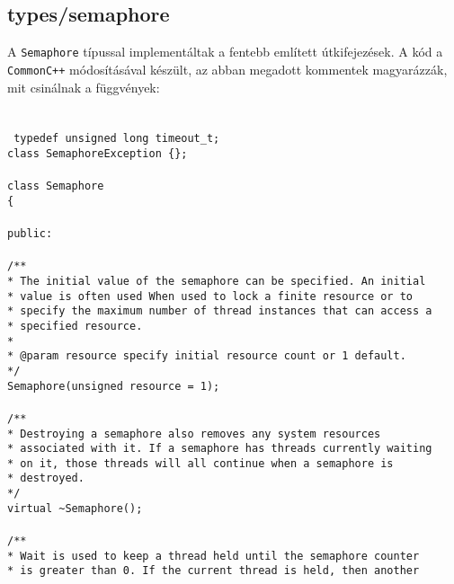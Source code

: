 \documentclass[fleqn,10pt,a4paper,titlepage]{article}
\begin{document}
  \subsection{types/semaphore}
  A \texttt{Semaphore} típussal implementáltak a fentebb említett útkifejezések. A kód a \texttt{CommonC++}
  módosításával készült, az abban megadott kommentek magyarázzák, mit csinálnak a függvények:\\\\\\
  \texttt{
    typedef unsigned long   timeout\_t;\\
    class SemaphoreException \{\};\\
     \\
     class Semaphore\\
    \{\\\\
    public:\\\\
    /**\\
     * The initial value of the semaphore can be specified.  An initial\\
     * value is often used When used to lock a finite resource or to\\
     * specify the maximum number of thread instances that can access a\\
     * specified resource.\\
     *\\
     * @param resource specify initial resource count or 1 default.\\
     */\\
    Semaphore(unsigned resource = 1);\\
    \\
    /**\\
     * Destroying a semaphore also removes any system resources\\
     * associated with it.  If a semaphore has threads currently waiting\\
     * on it, those threads will all continue when a semaphore is\\
     * destroyed.\\
     */\\
    virtual \~{}Semaphore();\\
    \\
    /**\\
     * Wait is used to keep a thread held until the semaphore counter\\
     * is greater than 0.  If the current thread is held, then another\\
}
\end{document}
